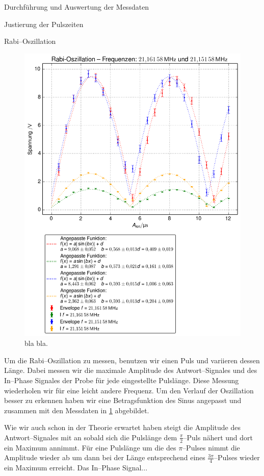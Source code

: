 \documentclass[pdftex, a4paper,11pt, twoside, ngerman]{report}
\begin{document}
\begin{chapter}{Durchführung und Auswertung der Messdaten}
\begin{section}{Justierung der Pulszeiten}
      
    \end{section}
    
    
    
    \begin{section}{Rabi--Oszillation}
      \label{chpRabi}
      
      \begin{figure}[b!]
        \centering
        \includegraphics[width=.7\textwidth]{Figures/Rabi_freq12.png}
        \caption{bla bla.}
        \label{figRabifreq12}
      \end{figure}
      
      Um die Rabi--Oszillation zu messen, benutzen wir einen Puls und variieren
      dessen Länge.
      Dabei messen wir die maximale Amplitude des Antwort--Signales und des
      In--Phase Signales der Probe für jede eingestellte Pulslänge.
      Diese Messung wiederholen wir für eine leicht andere Frequenz.
      Um den Verlauf der Oszillation besser zu erkennen haben wir eine
      Betragsfunktion des Sinus angepasst und zusammen mit den Messdaten in
      \cref{figRabifreq12} abgebildet.
      
      Wie wir auch schon in der Theorie erwartet haben steigt die Amplitude
      des Antwort--Signales mit an sobald sich die Pulslänge dem
      $\frac{\pi}{2}$--Puls nähert und dort ein Maximum annimmt.
      Für eine Pulslänge um die des $\pi$--Pulses nimmt die Amplitude wieder
      ab um dann bei der Länge entsprechend eines $\frac{3\pi}{4}$--Pulses
      wieder ein Maximum erreicht.
      Das In--Phase Signal...
      

\end{section}
\end{chapter}
\end{document}
